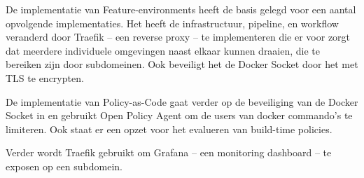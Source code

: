 De implementatie van Feature-environments heeft de basis gelegd voor een aantal opvolgende implementaties. Het heeft de infrastructuur, pipeline, en workflow veranderd door Traefik -- een reverse proxy -- te implementeren die er voor zorgt dat meerdere individuele omgevingen naast elkaar kunnen draaien, die te bereiken zijn door subdomeinen. Ook beveiligt het de Docker Socket door het met TLS te encrypten. 

De implementatie van Policy-as-Code gaat verder op de beveiliging van de Docker Socket in en gebruikt Open Policy Agent om de users van docker commando's te limiteren. Ook staat er een opzet voor het evalueren van build-time policies.

Verder wordt Traefik gebruikt om Grafana -- een monitoring dashboard -- te exposen op een subdomein.
